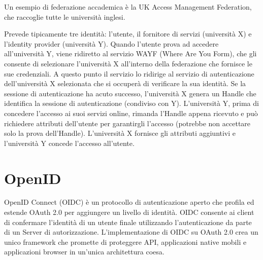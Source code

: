 Un esempio di federazione accademica è la UK Access Management Federation, che raccoglie tutte le università inglesi. 

Prevede tipicamente tre identità: l'utente, il fornitore di servizi (università X) e l'identity provider (università Y). Quando l'utente prova ad accedere all'università Y, viene ridiretto al servizio WAYF (Where Are You Form), che gli consente di selezionare l'università X all'interno della federazione che fornisce le sue credenziali. A questo punto il servizio lo ridirige al servizio di autenticazione dell'università X selezionata che si occuperà di verificare la sua identità. Se la sessione di autenticazione ha acuto successo, l'università X genera un Handle che identifica la sessione di autenticazione (condiviso con Y). L'università Y, prima di concedere l'accesso ai suoi servizi online, rimanda l'Handle appena ricevuto e può richiedere attributi dell'utente per garantirgli l'accesso (potrebbe non accettare solo la prova dell'Handle). L'università X fornisce gli attributi aggiuntivi e l'università Y concede l'accesso all'utente.

\section{OpenID}

OpenID Connect (OIDC) è un protocollo di autenticazione aperto che profila ed estende OAuth 2.0 per aggiungere un livello di identità. OIDC consente ai client di confermare l'identità di un utente finale utilizzando l'autenticazione da parte di un Server di autorizzazione. L'implementazione di OIDC su OAuth 2.0 crea un unico framework che promette di proteggere API, applicazioni native mobili e applicazioni browser in un'unica architettura coesa.